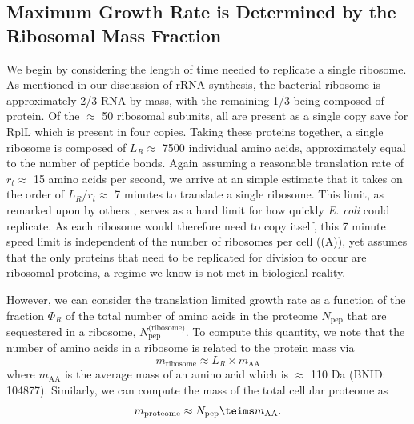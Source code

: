 \subsection{Maximum Growth Rate is Determined by the Ribosomal Mass Fraction}
We begin by considering the length of time needed to replicate a single
ribosome. As mentioned in our discussion of rRNA synthesis, the bacterial
ribosome is approximately 2/3 RNA by mass, with the remaining 1/3 being composed
of protein. Of the $\approx$ 50 ribosomal subunits, all are present as a single
copy save for RplL which is present in four copies. Taking these proteins
together, a single ribosome is composed of $L_R \approx$ 7500 individual amino
acids, approximately equal to the number of peptide bonds. Again assuming a
reasonable translation rate of $r_t \approx$ 15 amino acids per second, we arrive at
an simple estimate that it takes on the order of  $L_R / r_t \approx$ 7 minutes to
translate a single ribosome. This limit, as remarked upon by others
\citep{dill2011}, serves as a hard limit for how quickly \textit{E. coli} could
replicate. As each ribosome would therefore need to copy itself, this  7 minute
speed limit is independent of the number of ribosomes per cell
((A)), yet assumes that the only proteins that need
to be replicated for division to occur are ribosomal proteins, a regime we know is not met in
biological reality.

However, we can consider the translation limited growth rate as a function of
the fraction $\Phi_R$ of the total number of amino acids in the proteome $N_\text{pep}$
that are sequestered in a ribosome, $N_\text{pep}^\text{(ribosome)}$. To compute this quantity, we
note that the number of amino acids in a ribosome is related to the protein mass
via
\begin{equation}
  m_\text{ribosome} \approx L_R \times m_\text{AA}
  \label{eq:mribo}
\end{equation}
where $m_\text{AA}$ is the average mass of an amino acid which is $\approx$ 110
Da (BNID: 104877). Similarly, we can compute the mass of the total cellular
proteome as
\begin{equation}
  m_\text{proteome} \approx N_\text{pep} \teims m_\text{AA}.
  \label{eq:mproteome}
\end{equation}

